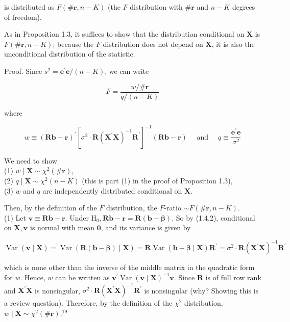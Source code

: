 \documentclass[10pt]{article}
\begin{document}
is distributed as $F(\# \mathbf{r}, n-K)$ (the $F$ distribution with $\# \mathbf{r}$ and $n-K$ degrees of freedom).

As in Proposition 1.3, it suffices to show that the distribution conditional on $\mathbf{X}$ is $F(\# \mathbf{r}, n-K)$; because the $F$ distribution does not depend on $\mathbf{X}$, it is also the unconditional distribution of the statistic.

Proof. Since $s^{2}=\mathbf{e}^{\prime} \mathbf{e} /(n-K)$, we can write

$$
F=\frac{w / \# \mathbf{r}}{q /(n-K)}
$$

where

$$
w \equiv(\mathbf{R} \mathbf{b}-\mathbf{r})^{\prime}\left[\sigma^{2} \cdot \mathbf{R}\left(\mathbf{X}^{\prime} \mathbf{X}\right)^{-1} \mathbf{R}^{\prime}\right]^{-1}(\mathbf{R} \mathbf{b}-\mathbf{r}) \quad \text { and } \quad q \equiv \frac{\mathbf{e}^{\prime} \mathbf{e}}{\sigma^{2}}
$$

We need to show\\
(1) $w \mid \mathbf{X} \sim \chi^{2}(\# \mathbf{r})$,\\
(2) $q \mid \mathbf{X} \sim \chi^{2}(n-K)$ (this is part (1) in the proof of Proposition 1.3),\\
(3) $w$ and $q$ are independently distributed conditional on $\mathbf{X}$.

Then, by the definition of the $F$ distribution, the $F$-ratio $\sim F(\# \mathbf{r}, n-K)$.\\
(1) Let $\mathbf{v} \equiv \mathbf{R b}-\mathbf{r}$. Under $\mathrm{H}_{0}, \mathbf{R b}-\mathbf{r}=\mathbf{R}(\mathbf{b}-\boldsymbol{\beta})$. So by (1.4.2), conditional on $\mathbf{X}, \mathbf{v}$ is normal with mean $\mathbf{0}$, and its variance is given by

$$
\operatorname{Var}(\mathbf{v} \mid \mathbf{X})=\operatorname{Var}(\mathbf{R}(\mathbf{b}-\boldsymbol{\beta}) \mid \mathbf{X})=\mathbf{R} \operatorname{Var}(\mathbf{b}-\boldsymbol{\beta} \mid \mathbf{X}) \mathbf{R}^{\prime}=\sigma^{2} \cdot \mathbf{R}\left(\mathbf{X}^{\prime} \mathbf{X}\right)^{-1} \mathbf{R}^{\prime}
$$

which is none other than the inverse of the middle matrix in the quadratic form for $w$. Hence, $w$ can be written as $\mathbf{v}^{\prime} \operatorname{Var}(\mathbf{v} \mid \mathbf{X})^{-1} \mathbf{v}$. Since $\mathbf{R}$ is of full row rank and $\mathbf{X}^{\prime} \mathbf{X}$ is nonsingular, $\sigma^{2} \cdot \mathbf{R}\left(\mathbf{X}^{\prime} \mathbf{X}\right)^{-1} \mathbf{R}^{\prime}$ is nonsingular (why? Showing this is a review question). Therefore, by the definition of the $\chi^{2}$ distribution, $w \mid \mathbf{X} \sim \chi^{2}(\# \mathbf{r}) .^{19}$
\end{document}
